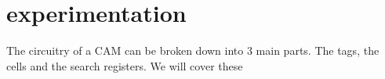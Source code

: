 \section{experimentation}
The circuitry of a CAM can be broken down into 3 main parts. The tags, the cells and the search registers. 
We will cover these 
